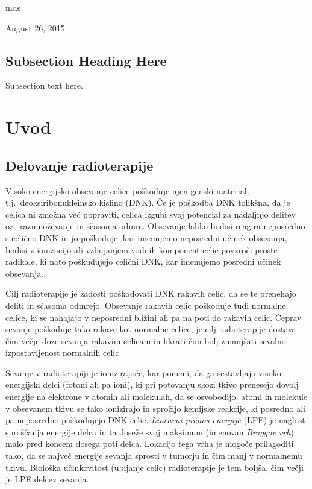 \documentclass[journal]{IEEEtran}
\begin{document}
\hfill mds
 
\hfill August 26, 2015

\subsection{Subsection Heading Here}
Subsection text here.


\section{Uvod}

\subsection{Delovanje radioterapije}

Visoko energijsko obsevanje celice poškoduje njen genski material, t.j.~deoksiribonukleinsko kislino (DNK). Če je poškodba DNK tolikšna, da je celica ni zmožna več popraviti, celica izgubi svoj potencial za nadaljnjo delitev oz.~razmnoževanje in sčasoma odmre. Obsevanje lahko bodisi reagira neposredno s celično DNK in jo poškoduje, kar imenujemo neposredni učinek obsevanja, bodisi z ionizacijo ali vzbujanjem vodnih komponent celic povzroči proste radikale, ki nato poškudujejo celični DNK, kar imenujemo posredni učinek obsevanja.

Cilj radioterapije je zadosti poškodovati DNK rakavih celic, da se te prenehajo deliti in sčasoma odmrejo. Obsevanje rakavih celic poškoduje tudi normalne celice, ki se nahajajo v neposredni bližini ali pa na poti do rakavih celic. Čeprav sevanje poškoduje tako rakave kot normalne celice, je cilj radioterapije dostava čim večje doze sevanja rakavim celicam in hkrati čim bolj zmanjšati sevalno izpostavljenost normalnih celic.

Sevanje v radioterapiji je ionizirajoče, kar pomeni, da ga sestavljajo visoko energijski delci (fotoni ali pa ioni), ki pri potovanju skozi tkivo prenesejo dovolj energije na elektrone v atomih ali molekulah, da se osvobodijo, atomi in molekule v obsevanem tkivu se tako ionizirajo in sprožijo kemijske reakcije, ki posredno ali pa neposredno poškodujejo DNK celic. \emph{Linearni prenos energije} (LPE) je naglost sproščanja energije delca in ta doseže svoj maksimum (imenovan \emph{Braggov vrh}) malo pred koncem dosega poti delca. Lokacijo tega vrha je mogoče prilagoditi tako, da se največ energije sevanja sprosti v tumorju in čim manj v normalnemu tkivu. Biološka učinkovitost (ubijanje celic) radioterapije je tem boljša, čim večji je LPE delcev sevanja.
\end{document}
